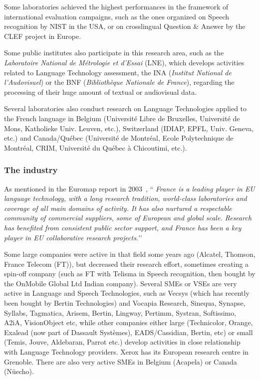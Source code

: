 \documentclass[]{../metanetpaper}
\begin{document}
\begin{multicols}{2}
Some laboratories achieved the highest performances in the framework
of international evaluation campaigns, such as the ones organized on
Speech recognition by NIST in the USA, or on crosslingual
Question \& Answer by the CLEF project in Europe.

Some public institutes also participate in this research area, such as
the {\em Laboratoire National de Métrologie et d’Essai} (LNE), which
develops activities related to Language Technology assessment, the INA
({\em Institut National de l’Audovisuel}) or the BNF ({\em Bibliothèque Nationale
de France}), regarding the processing of their huge amount of textual
or audiovisual data.

Several laboratories also conduct research on Language Technologies
applied to the French language in Belgium (Université  Libre de Bruxelles,
Université de Mons, Katholieke Univ. Leuven, etc.), Switzerland
(IDIAP, EPFL, Univ. Geneva, etc.) and Canada/Québec (Université de
Montréal, Ecole Polytechnique de Montréal, CRIM, Université du Québec
à Chicoutimi, etc.).

\subsubsection{The industry}

As mentioned in the Euromap report in 2003~\cite{euromap}, ``{\em
  France is a leading player in EU language technology, with a long
  research tradition, world-class laboratories and coverage of all
  main domains of activity. It has also nurtured a respectable
  community of commercial suppliers, some of European and global
  scale. Research has benefited from consistent public sector support,
  and France has been a key player in EU collaborative research
  projects.}{\mbox '}{\mbox '}

Some large companies were active in that field some years ago
(Alcatel, Thomson, France Telecom (FT)), but decreased their research
effort, sometimes creating a spin-off company (such as FT with Telisma
in Speech recognition, then bought by the OnMobile Global Ltd Indian
company). Several SMEs or VSEs are very active in Language and Speech
Technologies, such as Vecsys (which has recently been bought by Bertin
Technologies) and Vocapia Research, Sinequa, Synapse, Syllabs,
Tagmatica, Arisem, Bertin, Lingway, Pertimm, Systran, Softissimo,
A2iA, VisionObject etc, while other companies either large
(Technicolor, Orange, Exalead (now part of Dassault Systèmes),
EADS/Cassidian, Bertin, etc) or small (Temis, Jouve, Aldebaran, Parrot
etc.) develop activities in close relationship with Language
Technology providers. Xerox has its European research centre in
Grenoble. There are also very active SMEs in Belgium (Acapela) or
Canada (Nüecho).


\end{multicols}
\end{document}
